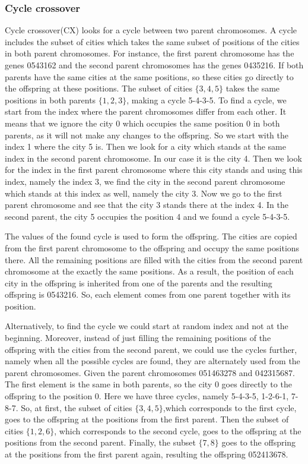 \documentclass[a4paper, 12pt, headings=standardclasses]{scrartcl}
\begin{document}
\subsubsection{Cycle crossover} 
Cycle crossover(CX) looks for a cycle between two parent chromosomes. A cycle includes the subset of cities which takes the same subset of positions of the cities in both parent chromosomes. For instance, the first parent chromosome has the genes 0543162 and the second parent chromosomes has the genes 0435216. If both parents have the same cities at the same positions, so these cities go directly to the offspring at these positions. The subset of cities $\{3,4,5\}$ takes the same positions in both parents $\{1,2,3\}$, making a cycle 5-4-3-5. 
To find a cycle, we start from the index where the parent chromosomes differ from each other. It means that we ignore the city 0 which occupies the same position 0 in both parents, as it will not make any changes to the offspring. So we start with the index 1 where the city 5 is. Then we look for a city which stands at the same index in the second parent chromosome. In our case it is the city 4. Then we look for the index in the first parent chromosome where this city stands and using this index, namely the index 3, we find the city in the second parent chromosome which stands at this index as well, namely the city 3. Now we go to the first parent chromosome and see that the city 3 stands there at the index 4. In the second parent, the city 5 occupies the position 4 and we found a cycle 5-4-3-5. \par

The values of the found cycle is used to form the offspring. The cities are copied from the first parent chromosome to the offspring and occupy the same positions there. All the remaining positions are filled with the cities from the second parent chromosome at the exactly the same positions. As a result, the position of each city in the offspring is inherited from one of the parents and the resulting offspring is 0543216. So, each element comes from one parent together with its position.\par

Alternatively, to find the cycle we could start at random index and not at the beginning. Moreover, instead of just filling the remaining positions of the offspring with the cities from the second parent, we could use the cycles further, namely when all the possible cycles are found, they are alternately used from the parent chromosomes. Given the parent chromosomes 051463278 and 042315687. The first element is the same in both parents, so the city 0 goes directly to the offspring to the position 0. Here we have  three cycles, namely 5-4-3-5, 1-2-6-1, 7-8-7. So, at first, the subset of cities $\{3,4,5\}$,which corresponds to the first cycle, goes to the offspring at the positions from the first parent. Then the subset of cities $\{1,2,6\}$, which corresponds to the second cycle, goes to the offspring at the positions from the second parent. Finally, the subset $\{7,8\}$ goes to the offspring at the positions from the first parent again, resulting the offspring 052413678.
\end{document}
